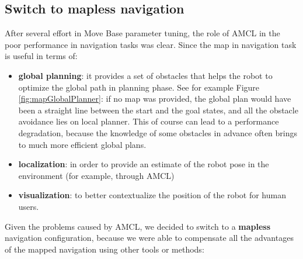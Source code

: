 \subsection{Switch to mapless navigation}
After several effort in Move Base parameter tuning, the role of  \ac{AMCL} in the poor performance in navigation tasks was clear. Since the map in navigation task is useful in terms of:
\begin{itemize}
	\item \textbf{global planning}: it provides a set of obstacles that helps the robot to optimize the global path in planning phase. See for example Figure \ref{fig:mapGlobalPlanner}: if no map was provided, the global plan would have been a straight line between the start and the goal states, and all the obstacle avoidance lies on local planner. This of course can lead to a performance degradation, because the knowledge of some obstacles in advance often brings to much more efficient global plans.
	\item \textbf{localization}: in order to provide an estimate of the robot pose in the environment (for example, through \ac{AMCL})
	\item \textbf{visualization}: to better contextualize the position of the robot for human users. 
\end{itemize}

Given the problems caused by \ac{AMCL}, we decided to switch to a \textbf{mapless} navigation configuration, because we were able to compensate all the advantages of the mapped navigation using other tools or methods:

